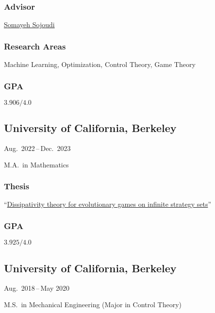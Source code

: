 \documentclass[11pt]{article}
\newcommand{\sectionwidth}{1in}		%
\newcommand{\subsectionskip}{\baselineskip}	%
\newcommand{\cvdates}[2]{\hfill#1\,--\,#2}	%
\begin{document}
	\subsubsection{Advisor}
	\href{https://people.eecs.berkeley.edu/~sojoudi/}{Somayeh Sojoudi}
	
	\subsubsection{Research Areas}
	Machine Learning, Optimization, Control Theory, Game Theory
	
	\begin{gpa-on}
		\subsubsection{GPA}
		$3.906/4.0$
	\end{gpa-on}
	
	\vspace*{\subsectionskip}

	\subsection{University of California, Berkeley}
	\cvdates{Aug.\ 2022}{Dec.\ 2023}

	\hspace*{\sectionwidth}M.A.\ in Mathematics

	\subsubsection{Thesis}
	``\href{https://brendon-anderson.github.io/files/publications/ma_thesis.pdf}{Dissipativity theory for evolutionary games on infinite strategy sets}''

	\begin{gpa-on}
		\subsubsection{GPA}
		$3.925/4.0$
	\end{gpa-on}

	\vspace*{\subsectionskip}
	
	\subsection{University of California, Berkeley}
	\cvdates{Aug.\ 2018}{May 2020}
	
	\hspace*{\sectionwidth}M.S.\ in Mechanical Engineering (Major in Control Theory)
	
\end{document}
